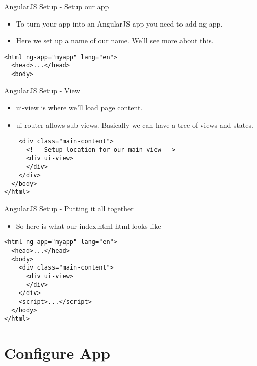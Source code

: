\documentclass[presentation]{beamer}
\begin{document}
\begin{frame}[fragile,label=sec-2-2]{AngularJS Setup - Setup our app}
 \begin{itemize}
\item To turn your app into an AngularJS app you need to add ng-app.
\item Here we set up a name of our name. We'll see more about this.
\end{itemize}

\begin{verbatim}
<html ng-app="myapp" lang="en">
  <head>...</head>
  <body>
\end{verbatim}
\end{frame}

\begin{frame}[fragile,label=sec-2-3]{AngularJS Setup - View}
 \begin{itemize}
\item ui-view is where we'll load page content.
\item ui-router allows sub views. Basically we can
have a tree of views and states.
\end{itemize}

\begin{verbatim}
    <div class="main-content">
      <!-- Setup location for our main view -->
      <div ui-view>
      </div>
    </div>
  </body>
</html>
\end{verbatim}
\end{frame}

\begin{frame}[fragile,label=sec-2-4]{AngularJS Setup - Putting it all together}
 \begin{itemize}
\item So here is what our index.html html looks like
\end{itemize}
\begin{verbatim}
<html ng-app="myapp" lang="en">
  <head>...</head>
  <body>
    <div class="main-content">
      <div ui-view>
      </div>
    </div>
    <script>...</script>
  </body>
</html>
\end{verbatim}
\end{frame}

\section{Configure App}
\label{sec-3}
\end{document}
